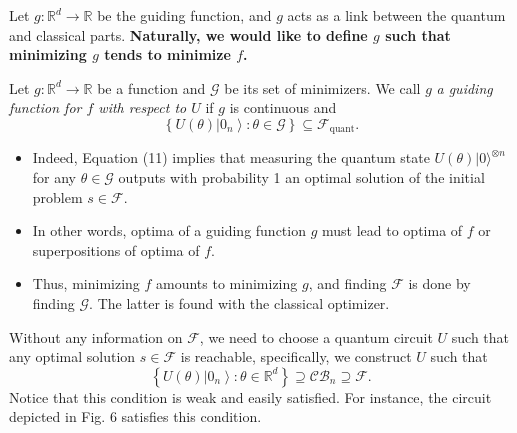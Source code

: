 Let $g: \mathbb{R}^{d} \rightarrow \mathbb{R}$ be the guiding function, and $g$ acts as a link between the quantum and classical parts. \textbf{Naturally, we would like to define $g$ such that minimizing $g$ tends to minimize $f$.}

\begin{definition}
    Let $g: \mathbb{R}^{d} \rightarrow \mathbb{R}$ be a function and $\mathcal{G}$ be its set of minimizers. We call $g$ \textit{a guiding function for $f$ with respect to $U$} if $g$ is continuous and
\begin{equation}
    \left\{U(\theta)\left|0_{n}\right\rangle: \theta \in \mathcal{G}\right\} \subseteq \mathcal{F}_{\text {quant}}. \tag{11}
\end{equation}
\end{definition}

\begin{itemize}
    \item Indeed, Equation (11) implies that measuring the quantum state $U\left(\theta\right)|0\rangle^{\otimes n}$ for any $\theta\in \mathcal{G}$ outputs with probability 1 an optimal solution of the initial problem $s \in \mathcal{F}$.
    \item In other words, optima of a guiding function $g$ must lead to optima of $f$ or superpositions of optima of $f$.
    \item Thus, minimizing $f$ amounts to minimizing $g$, and finding $\mathcal{F}$ is done by finding $\mathcal{G}$. The latter is found with the classical optimizer.
\end{itemize}


\begin{remark}
    Without any information on $\mathcal{F}$, we need to choose a quantum circuit $U$ such that any optimal solution $s \in \mathcal{F}$ is reachable, specifically, we construct $U$ such that
\begin{equation}
    \left\{U(\theta)\left|0_{n}\right\rangle: \theta \in \mathbb{R}^{d}\right\} \supseteq \mathcal{C} \mathcal{B}_{n} \supseteq \mathcal{F}. \tag{12}
\end{equation}
Notice that this condition is weak and easily satisfied. For instance, the circuit depicted in Fig. 6 satisfies this condition. %
\end{remark}


